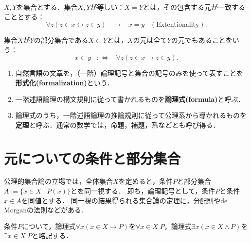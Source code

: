 \documentclass[uplatex, 12pt, dvipdfmx]{jsreport}
\begin{document}
\begin{axiom}[集合の相等]
    $X,Y$を集合とする．集合$X,Y$が等しい：$X=Y$とは，その包含する元が一致することとする：\[\forall z(z\in x\leftrightarrow z\in y)\;\;\;\rightarrow\;\;\; x=y \;\;\;\mathrm{(Extentionality)}.\]
\end{axiom}
\begin{definition}[包含関係]
    集合$X$が$Y$の部分集合である$X\subset Y$とは，$X$の元は全て$Y$の元でもあることをいう：\[x\subset y\;\;\;:\Leftrightarrow\;\;\;\forall z(z\in x\rightarrow z\in y).\]
\end{definition}

\begin{definition}[論理の用語]\mbox{}
    \begin{enumerate}
        \item 自然言語の文章を，（一階）論理記号と集合の記号のみを使って表すことを\textbf{形式化(formalization)}という．
        \item 一階述語論理の構文規則に従って書かれるものを\textbf{論理式(formula)}と呼ぶ．
        \item 論理式のうち，一階述語論理の推論規則に従って公理系から導かれるものを\textbf{定理}と呼ぶ．通常の数学では，命題，補題，系などとも呼び得る．
    \end{enumerate}
\end{definition}

\section{元についての条件と部分集合}

\begin{screen}
    公理的集合論の立場では，全体集合$X$を定めると，条件$P$と部分集合$A:=\{x\in X\mid P(x)\}$とを同一視する．
    即ち，論理記号として，条件$P$と条件$x\in A$を同値とする．
    同一視の結果得られる集合論の定理に，分配則やde Morganの法則などがある．
\end{screen}

\begin{notation}
    条件$P$について，論理式$\forall x(x\in X\rightarrow P)$を$\forall x\in X\;P$，論理式$\exists x(x\in X\land P)$を$\exists x\in X\;P$と略記する．
\end{notation}
\end{document}
